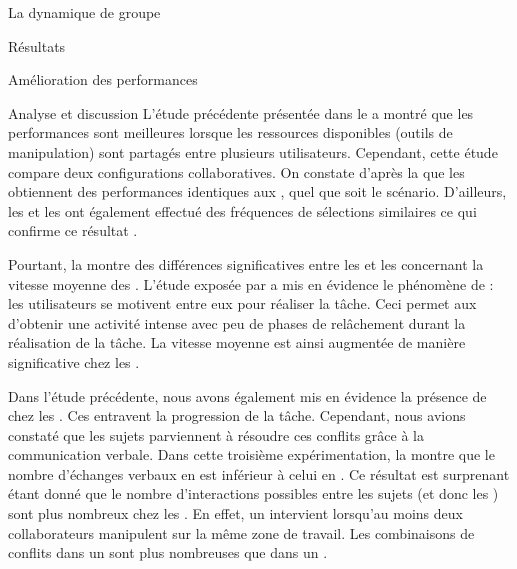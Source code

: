 \documentclass[myfrancais,ngerman,english,frenchb]{mythesis}
\begin{document}
\begin{mychapter}{La dynamique de groupe}
\begin{mysection}{Résultats}
\begin{mysubsection}{Amélioration des performances}
\begin{mysubsubsection}{Analyse et discussion}
					L'étude précédente présentée dans le  a montré que les performances sont meilleures lorsque les ressources disponibles (outils de manipulation) sont partagés entre plusieurs utilisateurs.
					Cependant, cette étude compare deux configurations collaboratives.
					On constate d'après la  que les  obtiennent des performances identiques aux , quel que soit le scénario.
					D'ailleurs, les  et les  ont également effectué des fréquences de sélections similaires ce qui confirme ce résultat .

					Pourtant, la  montre des différences significatives entre les  et les  concernant la vitesse moyenne des .
					L'étude exposée par  a mis en évidence le phénomène de  : les utilisateurs se motivent entre eux pour réaliser la tâche.
					Ceci permet aux  d'obtenir une activité intense avec peu de phases de relâchement durant la réalisation de la tâche.
					La vitesse moyenne est ainsi augmentée de manière significative chez les .

					Dans l'étude précédente, nous avons également mis en évidence la présence de  chez les .
					Ces  entravent la progression de la tâche.
					Cependant, nous avions constaté que les sujets parviennent à résoudre ces conflits grâce à la communication verbale.
					Dans cette troisième expérimentation, la  montre que le nombre d'échanges verbaux en  est inférieur à celui en .
					Ce résultat est surprenant étant donné que le nombre d'interactions possibles entre les sujets (et donc les ) sont plus nombreux chez les .
					En effet, un  intervient lorsqu'au moins deux collaborateurs manipulent sur la même zone de travail.
					Les combinaisons de conflits dans un  sont plus nombreuses que dans un .


\end{mysubsubsection}
\end{mysubsection}
\end{mysection}
\end{mychapter}
\end{document}
